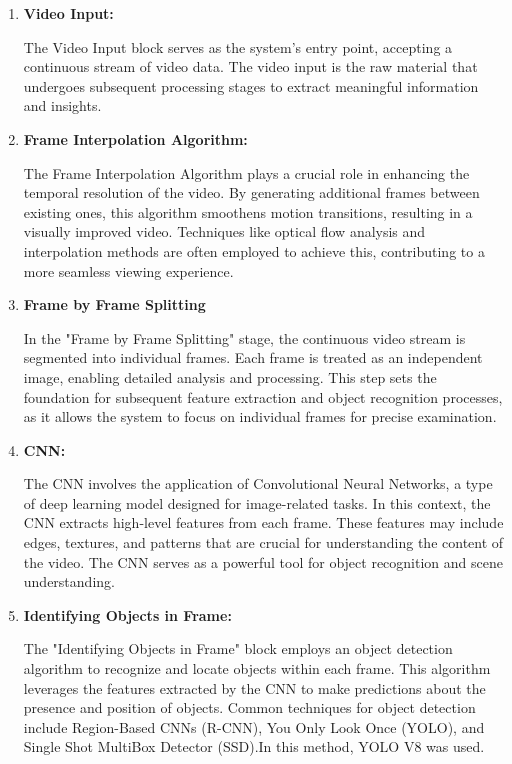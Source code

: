 \begin{enumerate}
    \item \textbf{Video Input:}

    The Video Input block serves as the system's entry point, accepting a continuous stream of video data. The video input is the raw material that undergoes subsequent processing stages to extract meaningful information and insights.

    
     \item \textbf{Frame Interpolation Algorithm:}
     
     The Frame Interpolation Algorithm plays a crucial role in enhancing the temporal resolution of the video. By generating additional frames between existing ones, this algorithm smoothens motion transitions, resulting in a visually improved video. Techniques like optical flow analysis and interpolation methods are often employed to achieve this, contributing to a more seamless viewing experience.\\

     \item\textbf{Frame by Frame Splitting}

     In the "Frame by Frame Splitting" stage, the continuous video stream is segmented into individual frames. Each frame is treated as an independent image, enabling detailed analysis and processing. This step sets the foundation for subsequent feature extraction and object recognition processes, as it allows the system to focus on individual frames for precise examination.
     
     \item\textbf{CNN:}

     The CNN involves the application of Convolutional Neural Networks, a type of deep learning model designed for image-related tasks. In this context, the CNN extracts high-level features from each frame. These features may include edges, textures, and patterns that are crucial for understanding the content of the video. The CNN serves as a powerful tool for object recognition and scene understanding.
     
     \item\textbf{Identifying Objects in Frame:}

     The "Identifying Objects in Frame" block employs an object detection algorithm to recognize and locate objects within each frame. This algorithm leverages the features extracted by the CNN to make predictions about the presence and position of objects. Common techniques for object detection include Region-Based CNNs (R-CNN), You Only Look Once (YOLO), and Single Shot MultiBox Detector (SSD).In this method, YOLO V8 was used.
     

\end{enumerate}
